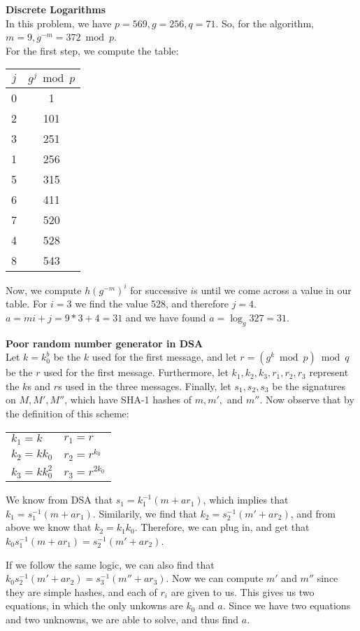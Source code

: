 \documentclass[12pt]{article}
\begin{document}
\begin{list}{.}{}
\item \textbf{Discrete Logarithms}\\
In this problem, we have $p=569, g=256, q=71$.  So, for the algorithm, $m=9,
g^{-m} = 372 \bmod p$.\\
For the first step, we compute the table:
\begin{center}
\begin{tabular}{c|c}
$j$ & $g^j \bmod p$\\
\hline
0 & 1\\
2 & 101\\
3 & 251\\
1 & 256\\
5 & 315\\
6 & 411\\
7 & 520\\
4 & 528\\
8 & 543\\
\end{tabular}
\end{center}
Now, we compute $h(g^{-m})^{i}$ for successive $i$s until we come across a value
in our table.  For $i=3$ we find the value 528, and therefore $j=4$.  $a = mi +
j = 9*3 + 4 = 31$ and we have found $a = \log _g 327 = 31$.

\item \textbf{Poor random number generator in DSA}\\
Let $k = k_0^b$ be the $k$ used for the first message, and let $r = (g^k \bmod
p) \bmod q$ be the $r$ used for the first message. Furthermore, let $k_1, k_2,
k_3, r_1, r_2, r_3$ represent the $k$s and $r$s used in the three messages.
Finally, let $s_1, s_2, s_3$ be the signatures on $M, M', M''$, which have SHA-1
hashes of $m, m',$ and $m''$.  Now observe that by the definition of this
scheme:
\begin{center}
\begin{tabular}{ll}
$k_1 = k$ & $r_1 = r$\\
$k_2 = kk_0$ & $r_2 = r^{k_0}$\\
$k_3 = kk_0^2$ & $r_3 = r^{2k_0}$
\end{tabular}
\end{center}
We know from DSA that $s_1 = k_1^{-1}(m + ar_1)$, which implies that $k_1 =
s_1^{-1}(m + ar_1)$.  Similarily, we find that $k_2 = s_2^{-1}(m' + ar_2)$, and
from above we know that $k_2 = k_1k_0$.  Therefore, we can plug in, and get that
$k_0s_1^{-1}(m+ar_1) = s_2^{-1}(m' + ar_2)$.

If we follow the same logic, we can also find that $k_0s_2^{-1}(m'+ar_2) =
s_3^{-1}(m'' + ar_3)$.  Now we can compute $m'$ and $m''$ since they are
simple hashes, and each of $r_i$ are given to us.  This gives us two equations,
in which the only unkowns are $k_0$ and $a$.  Since we have two equations and
two unknowns, we are able to solve, and thus find $a$.


\end{list}
\end{document}
